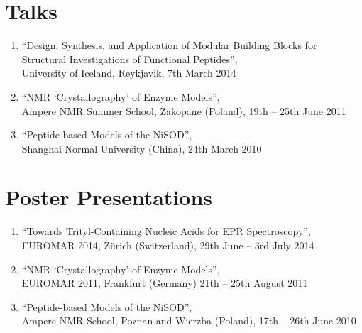 \documentclass{scrartcl}
\begin{document}
\section{Talks}
\begin{enumerate}
\item \enquote{Design, Synthesis, and Application of Modular Building Blocks for Structural Investigations of Functional Peptides},\\ University of Iceland, Reykjavik, 7th March 2014
\item \enquote{NMR \enquote{Crystallography} of Enzyme Models},\\ Ampere NMR Summer School, Zakopane (Poland), 19th -- 25th June 2011
\item \enquote{Peptide-based Models of the NiSOD},\\ Shanghai Normal University (China), 24th March 2010
\end{enumerate}

\section{Poster Presentations}
\begin{enumerate}
\item \enquote{Towards Trityl-Containing Nucleic Acids for EPR Spectroscopy},\\ EUROMAR 2014, Z\"urich (Switzerland), 29th June -- 3rd July 2014
\item \enquote{NMR \enquote{Crystallography} of Enzyme Models},\\ EUROMAR 2011, Frankfurt (Germany) 21th -- 25th August 2011
\item \enquote{Peptide-based Models of the NiSOD},\\ Ampere NMR School, Poznan and Wierzba (Poland), 17th -- 26th June 2010
\end{enumerate}

\label{lastpage}%
\end{document}

